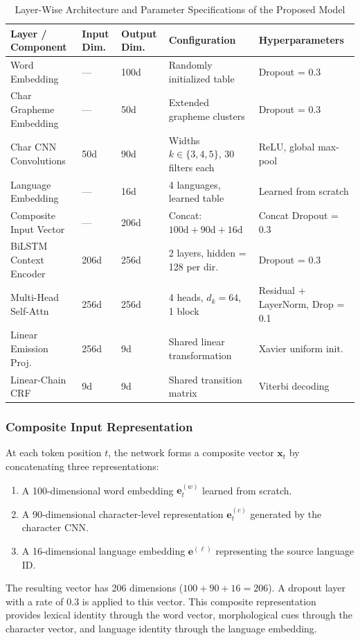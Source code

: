 \documentclass[pdflatex,sn-mathphys-num]{sn-jnl}
\begin{document}
\begin{table}[htbp]
\centering
\caption{Layer-Wise Architecture and Parameter Specifications of the Proposed Model}
\label{tab:architecture}
\small
\begin{tabular}{lllll}
\toprule
\textbf{Layer / Component} & \textbf{Input Dim.} & \textbf{Output Dim.} & \textbf{Configuration} & \textbf{Hyperparameters} \\
\midrule
Word Embedding         & ---    & 100d  & Randomly initialized table & Dropout = 0.3 \\
Char Grapheme Embedding & ---   & 50d   & Extended grapheme clusters & Dropout = 0.3 \\
Char CNN Convolutions  & 50d    & 90d   & Widths $k \in \{3,4,5\}$, 30 filters each & ReLU, global max-pool \\
Language Embedding     & ---    & 16d   & 4 languages, learned table & Learned from scratch \\
Composite Input Vector & ---    & 206d  & Concat: $100\text{d} + 90\text{d} + 16\text{d}$ & Concat Dropout = 0.3 \\
BiLSTM Context Encoder & 206d   & 256d  & 2 layers, hidden = 128 per dir. & Dropout = 0.3 \\
Multi-Head Self-Attn   & 256d   & 256d  & 4 heads, $d_k = 64$, 1 block & Residual + LayerNorm, Drop = 0.1 \\
Linear Emission Proj.  & 256d   & 9d    & Shared linear transformation & Xavier uniform init. \\
Linear-Chain CRF       & 9d     & 9d    & Shared transition matrix & Viterbi decoding \\
\bottomrule
\end{tabular}
\end{table}

\subsubsection{Composite Input Representation}\label{subsubsec:composite_rep}

At each token position $t$, the network forms a composite vector $\mathbf{x}_t$ by concatenating three representations:
\begin{enumerate}
    \item A 100-dimensional word embedding $\mathbf{e}^{(w)}_t$ learned from scratch.
    \item A 90-dimensional character-level representation $\mathbf{e}^{(c)}_t$ generated by the character CNN.
    \item A 16-dimensional language embedding $\mathbf{e}^{(\ell)}$ representing the source language ID.
\end{enumerate}
The resulting vector has 206 dimensions ($100 + 90 + 16 = 206$). A dropout layer with a rate of 0.3 is applied to this vector. This composite representation provides lexical identity through the word vector, morphological cues through the character vector, and language identity through the language embedding.
\end{document}
